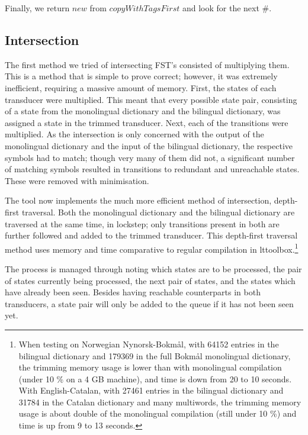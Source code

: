 \documentclass[10pt, a4paper]{article}
\begin{document}
Finally, we return $new$ from $copyWithTagsFirst$ and look for the
next \#.

\subsection{Intersection}


The first method we tried of intersecting FST's consisted of
multiplying them. This is a method that is simple to prove correct;
however, it was extremely inefficient, requiring a massive amount of
memory. First, the states of each transducer were multiplied. This
meant that every possible state pair, consisting of a state from the
monolingual dictionary and the bilingual dictionary, was assigned a
state in the trimmed transducer. Next, each of the transitions were
multiplied. As the intersection is only concerned with the output of
the monolingual dictionary and the input of the bilingual dictionary,
the respective symbols had to match; though very many of them did not,
a significant number of matching symbols resulted in transitions to
redundant and unreachable states. These were removed with
minimisation.

The tool now implements the much more efficient method of
intersection, depth-first traversal. Both the monolingual dictionary
and the bilingual dictionary are traversed at the same time, in
lockstep; only transitions present in both are further followed and
added to the trimmed transducer. This depth-first traversal method
uses memory and time comparative to regular compilation in
lttoolbox.\footnote{When testing on Norwegian Nynorsk-Bokmål, with
  64152 entries in the bilingual dictionary and 179369 in the full
  Bokmål monolingual dictionary, the trimming memory usage is lower
  than with monolingual compilation (under 10 \% on a 4 GB machine),
  and time is down from 20 to 10 seconds. With English-Catalan, with
  27461 entries in the bilingual dictionary and 31784 in the Catalan
  dictionary and many multiwords, the trimming memory usage is about
  double of the monolingual compilation (still under 10 \%) and time
  is up from 9 to 13 seconds.}

The process is managed through noting which states are to be
processed, the pair of states currently being processed, the next pair
of states, and the states which have already been seen. Besides having
reachable counterparts in both transducers, a state pair will only be
added to the queue if it has not been seen yet.
\end{document}
